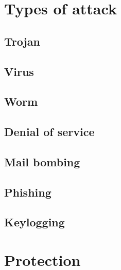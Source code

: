 \documentclass[a4paper,oneside]{report}
\begin{document}
  	\section{Types of attack}
    	\subsection{Trojan}
    	\subsection{Virus}
    	\subsection{Worm}
    	\subsection{Denial of service}
    	\subsection{Mail bombing}
    	\subsection{Phishing}
    	\subsection{Keylogging}
  	\section{Protection}
\end{document}
